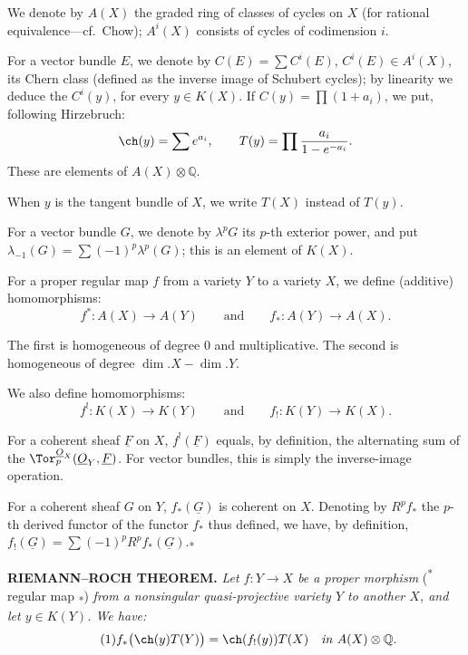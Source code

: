 We denote by \(A(X)\) the graded ring of classes of cycles on \(X\) (for rational equivalence---cf.\ Chow); \(A^i(X)\) consists of cycles of codimension \(i\).

For a vector bundle \(E\), we denote by \(C(E)=\sum C^i(E)\), \(C^i(E)\in A^i(X)\), its Chern class (defined as the inverse image of Schubert cycles); by linearity we deduce the \(C^i(y)\), for every \(y\in K(X)\). If \(C(y)=\prod(1+a_i)\), we put, following Hirzebruch:
\[
  \ch(y)=\sum e^{a_i},\qquad
  T(y)=\prod\frac{a_i}{1-e^{-a_i}}.
\]
These are elements of \(A(X)\otimes\mathbb Q\).

When \(y\) is the tangent bundle of \(X\), we write \(T(X)\) instead of \(T(y)\).

For a vector bundle \(G\), we denote by \(\lambda^pG\) its \(p\)-th exterior power, and put \(\lambda_{-1}(G)=\sum(-1)^p\lambda^p(G)\); this is an element of \(K(X)\).

For a proper regular map \(f\) from a variety \(Y\) to a variety \(X\), we define (additive) homomorphisms:
\[
  f^*:A(X)\longrightarrow A(Y)\qquad\text{and}\qquad
  f_*:A(Y)\longrightarrow A(X).
\]

The first is homogeneous of degree \(0\) and multiplicative. The second is homogeneous of degree \(\dim.X-\dim.Y\).

We also define homomorphisms:
\[
  f^!:K(X)\longrightarrow K(Y)\qquad\text{and}\qquad
  f_!:K(Y)\longrightarrow K(X).
\]

For a coherent sheaf \(\underline F\) on \(X\), \(f^!(\underline F)\) equals, by definition, the alternating sum of the \(\Tor_p^{\underline{O}_X}(\underline{O}_Y,\underline F)\). For vector bundles, this is simply the inverse-image operation.

%
For a coherent sheaf \(G\) on \(Y\), \(f_*(\underline G)\) is coherent on \(X\). Denoting by \(R^pf_*\) the \(p\)-th derived functor of the functor \(f_*\) thus defined, we have, by definition, \(f_!(\underline G)=\sum(-1)^p R^pf_*(\underline G)\).\quad\textsubscript{*}

\textbf{RIEMANN--ROCH THEOREM.} \emph{Let \(f:Y\longrightarrow X\) be a proper morphism} (\textsuperscript{*} regular map \textsubscript{*}) \emph{from a nonsingular quasi-projective variety \(Y\) to another \(X\), and let \(y\in K(Y)\). We have:}
\begin{equation}\tag{1}
  f_*\bigl(\ch(y)T(Y)\bigr)=\ch(f_!(y))T(X)
  \quad\text{\emph{in} } A(X)\otimes\mathbb Q.
\end{equation}

